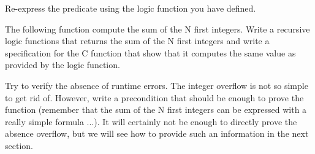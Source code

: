 Re-express the  predicate using the logic function you
have defined.





The following function compute the sum of the N first integers. Write a
recursive logic functions that returns the sum of the N first integers and
write a specification for the C function that show that it computes the same
value as provided by the logic function.




Try to verify the absence of runtime errors. The integer overflow is not so
simple to get rid of. However, write a precondition that should be enough to
prove the function (remember that the sum of the N first integers can be
expressed with a really simple formula ...). It will certainly not be enough
to directly prove the absence overflow, but we will see how to provide such
an information in the next section.
